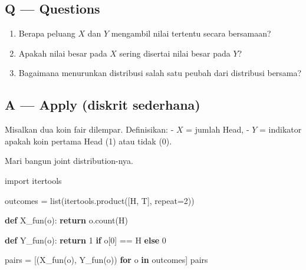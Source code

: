 \documentclass[
  letterpaper,
  DIV=11,
  numbers=noendperiod]{scrreprt}
\newenvironment{Shaded}{\begin{snugshade}}{\end{snugshade}}
\newcommand{\BuiltInTok}[1]{\textcolor[rgb]{0.00,0.23,0.31}{#1}}
\newcommand{\ControlFlowTok}[1]{\textcolor[rgb]{0.00,0.23,0.31}{\textbf{#1}}}
\newcommand{\DecValTok}[1]{\textcolor[rgb]{0.68,0.00,0.00}{#1}}
\newcommand{\ImportTok}[1]{\textcolor[rgb]{0.00,0.46,0.62}{#1}}
\newcommand{\KeywordTok}[1]{\textcolor[rgb]{0.00,0.23,0.31}{\textbf{#1}}}
\newcommand{\NormalTok}[1]{\textcolor[rgb]{0.00,0.23,0.31}{#1}}
\newcommand{\OperatorTok}[1]{\textcolor[rgb]{0.37,0.37,0.37}{#1}}
\newcommand{\StringTok}[1]{\textcolor[rgb]{0.13,0.47,0.30}{#1}}
\providecommand{\tightlist}{%
  \setlength{\itemsep}{0pt}\setlength{\parskip}{0pt}}
\begin{document}
\subsection{Q --- Questions}\label{q-questions-31}

\begin{enumerate}
\def\labelenumi{\arabic{enumi}.}
\tightlist
\item
  Berapa peluang \(X\) dan \(Y\) mengambil nilai tertentu secara
  bersamaan?
\item
  Apakah nilai besar pada \(X\) sering disertai nilai besar pada \(Y\)?
\item
  Bagaimana menurunkan distribusi salah satu peubah dari distribusi
  bersama?
\end{enumerate}

\subsection{A --- Apply (diskrit
sederhana)}\label{a-apply-diskrit-sederhana}

Misalkan dua koin fair dilempar. Definisikan: - \(X\) = jumlah Head, -
\(Y\) = indikator apakah koin pertama Head (1) atau tidak (0).

Mari bangun joint distribution-nya.

\begin{Shaded}
\begin{Highlighting}[]
\ImportTok{import}\NormalTok{ itertools}

\NormalTok{outcomes }\OperatorTok{=} \BuiltInTok{list}\NormalTok{(itertools.product([}\StringTok{\textquotesingle{}H\textquotesingle{}}\NormalTok{, }\StringTok{\textquotesingle{}T\textquotesingle{}}\NormalTok{], repeat}\OperatorTok{=}\DecValTok{2}\NormalTok{))}

\KeywordTok{def}\NormalTok{ X\_fun(o):}
    \ControlFlowTok{return}\NormalTok{ o.count(}\StringTok{\textquotesingle{}H\textquotesingle{}}\NormalTok{)}

\KeywordTok{def}\NormalTok{ Y\_fun(o):}
    \ControlFlowTok{return} \DecValTok{1} \ControlFlowTok{if}\NormalTok{ o[}\DecValTok{0}\NormalTok{] }\OperatorTok{==} \StringTok{\textquotesingle{}H\textquotesingle{}} \ControlFlowTok{else} \DecValTok{0}

\NormalTok{pairs }\OperatorTok{=}\NormalTok{ [(X\_fun(o), Y\_fun(o)) }\ControlFlowTok{for}\NormalTok{ o }\KeywordTok{in}\NormalTok{ outcomes]}
\NormalTok{pairs}
\end{Highlighting}
\end{Shaded}
\end{document}
